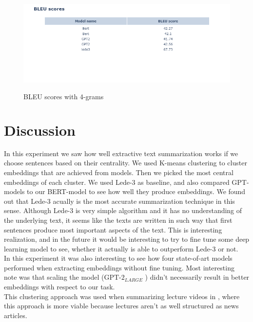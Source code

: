 \documentclass{article}
\newcommand{\gptlarge}{$\text{GPT-2}_{LARGE}$ }
\begin{document}
\begin{figure}[H]
	\centering
	\hspace*{-2cm}
	\includegraphics[scale=0.55]{bleu_scores.png}\\
	\caption{BLEU scores with 4-grams}
	\label{fig:bleu}
\end{figure}

\clearpage
\section{Discussion}

\noindent
In this experiment we saw how well extractive text summarization works if we choose sentences based on their centrality. We used K-means clustering to cluster embeddings that are achieved from models. Then we picked the most central embeddings of each cluster. We used Lede-3 as baseline, and also compared GPT-models to our BERT-model to see how well they produce embeddings. We found out that Lede-3 acually is the most accurate summarization technique in this sense. Although Lede-3 is very simple algorithm and it has no understanding of the underlying text, it seems like the texts are written in such way that first sentences produce most important aspects of the text. This is interesting realization, and in the future it would be interesting to try to fine tune some deep learning model to see, whether it actually is able to outperform Lede-3 or not.\\

\noindent
In this experiment it was also interesting to see how four state-of-art models performed when extracting embeddings without fine tuning. Most interesting note was that scaling the model (\gptlarge) didn't necessarily result in better embeddings with respect to our task.\\

\noindent
This clustering approach was used when summarizing lecture videos in \cite{extractive_bert}, where this approach is more viable because lectures aren't as well structured as news articles. 
\end{document}
